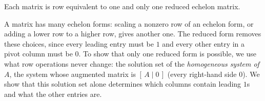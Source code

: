 \documentclass[10pt]{scrartcl}
\begin{document}
\begin{theorem*}
  Each matrix is row equivalent to one and only one reduced echelon matrix.
\end{theorem*}
\begin{ideabox}
  A matrix has many echelon forms: scaling a nonzero row of an echelon form, or adding a lower row to a higher row, gives another one. The reduced form removes these choices, since every leading entry must be $1$ and every other entry in a pivot column must be $0$. To show that only one reduced form is possible, we use what row operations never change: the solution set of the \emph{homogeneous system of $A$}, the system whose augmented matrix is $[\,A\mid 0\,]$ (every right-hand side $0$). We show that this solution set alone determines which columns contain leading $1$s and what the other entries are.
\end{ideabox}
\end{document}
